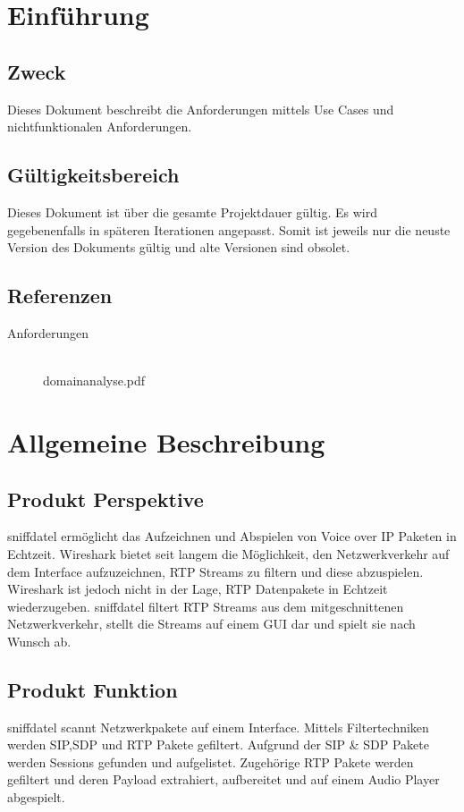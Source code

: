 \documentclass[a4,12pt]{scrartcl}
\begin{document}
\section{Einführung}
\subsection{Zweck}
Dieses Dokument beschreibt die Anforderungen mittels Use Cases und nichtfunktionalen Anforderungen.
\subsection{Gültigkeitsbereich}
Dieses Dokument ist über die gesamte Projektdauer gültig. Es wird gegebenenfalls in späteren Iterationen angepasst. Somit ist jeweils nur die neuste Version des Dokuments gültig und alte Versionen sind obsolet.
\subsection{Referenzen}
\begin{description}
  \item[Anforderungen] \hfill \\
  domainanalyse.pdf \\
\end{description}

\section{Allgemeine Beschreibung}
\subsection{Produkt Perspektive}
sniffdatel ermöglicht das Aufzeichnen und Abspielen von Voice over IP Paketen in
Echtzeit. Wireshark bietet seit langem die Möglichkeit, den Netzwerkverkehr auf
dem Interface aufzuzeichnen, RTP Streams zu filtern und diese abzuspielen. Wireshark
ist jedoch nicht in der Lage, RTP Datenpakete in Echtzeit wiederzugeben.
sniffdatel filtert RTP Streams aus dem mitgeschnittenen Netzwerkverkehr, stellt
die Streams auf einem GUI dar und spielt sie nach Wunsch ab.
\subsection{Produkt Funktion}
sniffdatel scannt Netzwerkpakete auf einem Interface. Mittels Filtertechniken werden SIP,SDP und RTP Pakete gefiltert. Aufgrund der SIP & SDP Pakete werden Sessions gefunden und aufgelistet. Zugehörige RTP Pakete werden gefiltert und deren Payload extrahiert, aufbereitet und auf einem Audio Player abgespielt.
\end{document}
